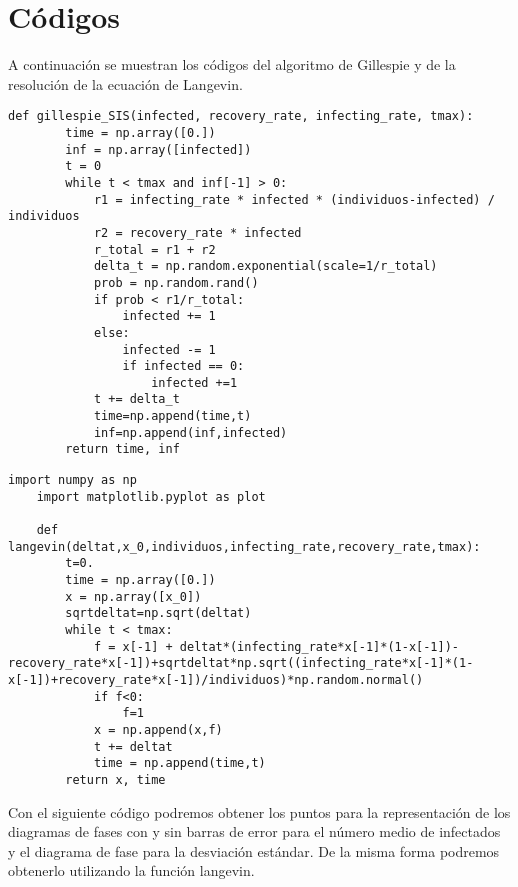 \chapter*{Códigos}
A continuación se muestran los códigos del algoritmo de Gillespie y de la resolución de la ecuación de Langevin.

\begin{lstlisting}[frame=single,caption=Algoritmo de Gillespie.]
        def gillespie_SIS(infected, recovery_rate, infecting_rate, tmax):
        time = np.array([0.])
        inf = np.array([infected])
        t = 0
        while t < tmax and inf[-1] > 0:     
            r1 = infecting_rate * infected * (individuos-infected) / individuos 
            r2 = recovery_rate * infected   
            r_total = r1 + r2
            delta_t = np.random.exponential(scale=1/r_total)
            prob = np.random.rand() 
            if prob < r1/r_total: 
                infected += 1
            else: 
                infected -= 1
                if infected == 0:
                    infected +=1
            t += delta_t
            time=np.append(time,t)
            inf=np.append(inf,infected)
        return time, inf
\end{lstlisting}
\newpage
\begin{lstlisting}[frame=single,caption=Resolución de la ecuación de Langevin.]
    import numpy as np
    import matplotlib.pyplot as plot
    
    def langevin(deltat,x_0,individuos,infecting_rate,recovery_rate,tmax):
        t=0.
        time = np.array([0.])
        x = np.array([x_0])
        sqrtdeltat=np.sqrt(deltat)
        while t < tmax:
            f = x[-1] + deltat*(infecting_rate*x[-1]*(1-x[-1])-recovery_rate*x[-1])+sqrtdeltat*np.sqrt((infecting_rate*x[-1]*(1-x[-1])+recovery_rate*x[-1])/individuos)*np.random.normal()
            if f<0:
                f=1
            x = np.append(x,f)
            t += deltat
            time = np.append(time,t)
        return x, time
\end{lstlisting}
\newpage
Con el siguiente código podremos obtener los puntos para la representación de los diagramas de fases con y sin barras de error para el número medio de infectados y el diagrama de fase
para la desviación estándar. De la misma forma podremos obtenerlo utilizando la función langevin.

